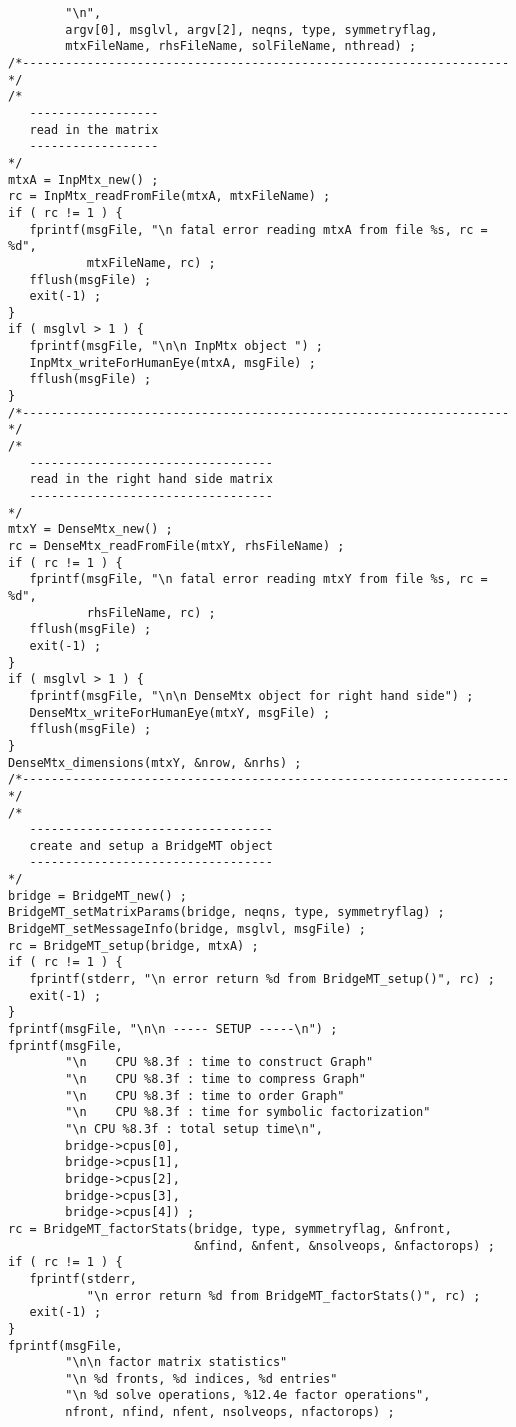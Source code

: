 \begin{verbatim}
        "\n",
        argv[0], msglvl, argv[2], neqns, type, symmetryflag, 
        mtxFileName, rhsFileName, solFileName, nthread) ;
/*--------------------------------------------------------------------*/
/*
   ------------------
   read in the matrix
   ------------------
*/
mtxA = InpMtx_new() ;
rc = InpMtx_readFromFile(mtxA, mtxFileName) ;
if ( rc != 1 ) {
   fprintf(msgFile, "\n fatal error reading mtxA from file %s, rc = %d",
           mtxFileName, rc) ;
   fflush(msgFile) ;
   exit(-1) ;
}
if ( msglvl > 1 ) {
   fprintf(msgFile, "\n\n InpMtx object ") ;
   InpMtx_writeForHumanEye(mtxA, msgFile) ;
   fflush(msgFile) ;
}
/*--------------------------------------------------------------------*/
/*
   ----------------------------------
   read in the right hand side matrix
   ----------------------------------
*/
mtxY = DenseMtx_new() ;
rc = DenseMtx_readFromFile(mtxY, rhsFileName) ;
if ( rc != 1 ) {
   fprintf(msgFile, "\n fatal error reading mtxY from file %s, rc = %d",
           rhsFileName, rc) ;
   fflush(msgFile) ;
   exit(-1) ;
}
if ( msglvl > 1 ) {
   fprintf(msgFile, "\n\n DenseMtx object for right hand side") ;
   DenseMtx_writeForHumanEye(mtxY, msgFile) ;
   fflush(msgFile) ;
}
DenseMtx_dimensions(mtxY, &nrow, &nrhs) ;
/*--------------------------------------------------------------------*/
/*
   ----------------------------------
   create and setup a BridgeMT object
   ----------------------------------
*/
bridge = BridgeMT_new() ;
BridgeMT_setMatrixParams(bridge, neqns, type, symmetryflag) ;
BridgeMT_setMessageInfo(bridge, msglvl, msgFile) ;
rc = BridgeMT_setup(bridge, mtxA) ;
if ( rc != 1 ) {
   fprintf(stderr, "\n error return %d from BridgeMT_setup()", rc) ;
   exit(-1) ;
}
fprintf(msgFile, "\n\n ----- SETUP -----\n") ;
fprintf(msgFile, 
        "\n    CPU %8.3f : time to construct Graph"
        "\n    CPU %8.3f : time to compress Graph"
        "\n    CPU %8.3f : time to order Graph"
        "\n    CPU %8.3f : time for symbolic factorization"
        "\n CPU %8.3f : total setup time\n",
        bridge->cpus[0],
        bridge->cpus[1],
        bridge->cpus[2],
        bridge->cpus[3],
        bridge->cpus[4]) ;
rc = BridgeMT_factorStats(bridge, type, symmetryflag, &nfront,
                          &nfind, &nfent, &nsolveops, &nfactorops) ;
if ( rc != 1 ) {
   fprintf(stderr,
           "\n error return %d from BridgeMT_factorStats()", rc) ;
   exit(-1) ;
}
fprintf(msgFile,
        "\n\n factor matrix statistics"
        "\n %d fronts, %d indices, %d entries"
        "\n %d solve operations, %12.4e factor operations",
        nfront, nfind, nfent, nsolveops, nfactorops) ;

\end{verbatim}
